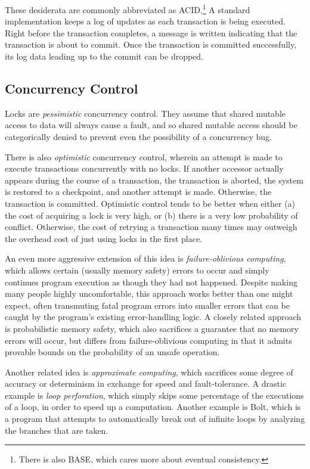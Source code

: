 \documentclass[twoside]{article}
\begin{document}
These desiderata are commonly abbreviated as ACID.\footnote{There is also BASE, which cares more about eventual consistency.}
A standard implementation keeps a log of updates as each transaction is being executed.
Right before the transaction completes, a message is written indicating that the transaction is about to commit.
Once the transaction is committed successfully, its log data leading up to the commit can be dropped.

\subsection{Concurrency Control}
Locks are \textit{pessimistic} concurrency control.
They assume that shared mutable access to data will always cause a fault, and so shared mutable access should be categorically denied to prevent even the possibility of a concurrency bug.

There is also \textit{optimistic} concurrency control, wherein an attempt is made to execute transactions concurrently with no locks.
If another accessor actually appears during the course of a transaction, the transaction is aborted, the system is restored to a checkpoint, and another attempt is made.
Otherwise, the transaction is committed.
Optimistic control tends to be better when either (a) the cost of acquiring a lock is very high, or (b) there is a very low probability of conflict.
Otherwise, the cost of retrying a transaction many times may outweigh the overhead cost of just using locks in the first place.

An even more aggressive extension of this idea is \textit{failure-oblivious computing}, which allows certain (usually memory safety) errors to occur and simply continues program execution as though they had not happened.
Despite making many people highly uncomfortable, this approach works better than one might expect, often transmuting fatal program errors into smaller errors that can be caught by the program's existing error-handling logic.
A closely related approach is probabilistic memory safety, which also sacrifices a guarantee that no memory errors will occur, but differs from failure-oblivious computing in that it admits provable bounds on the probability of an unsafe operation.

Another related idea is \textit{approximate computing}, which sacrifices some degree of accuracy or determinism in exchange for speed and fault-tolerance.
A drastic example is \textit{loop perforation}, which simply skips some percentage of the executions of a loop, in order to speed up a computation.
Another example is Bolt, which is a program that attempts to automatically break out of infinite loops by analyzing the branches that are taken.
\end{document}
